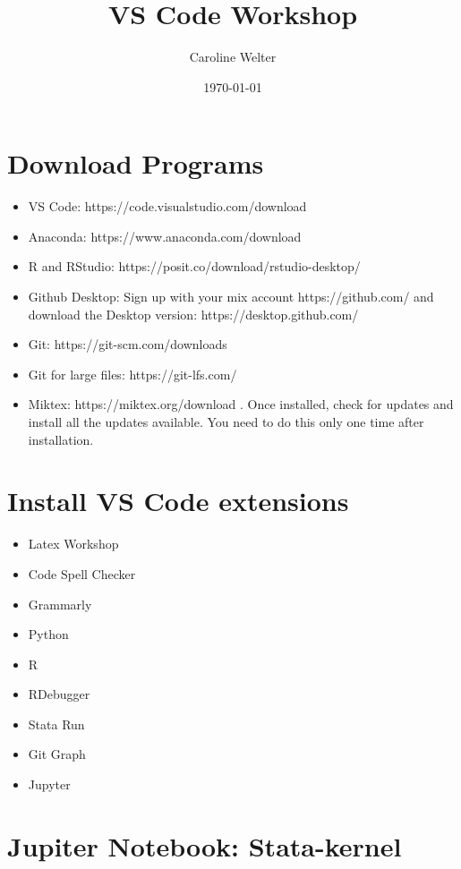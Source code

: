 \documentclass[12pt]{article}
\title{VS Code Workshop}
\author{Caroline Welter}
\date{\today}
\begin{document}
 
\maketitle
{}
\thispagestyle{empty}


\section{Download Programs}

\begin{itemize}
  \item VS Code: https://code.visualstudio.com/download
  \item Anaconda: https://www.anaconda.com/download 
  \item R and RStudio: https://posit.co/download/rstudio-desktop/
  \item Github Desktop: Sign up with your mix account https://github.com/ and download the Desktop version: https://desktop.github.com/
  \item Git: https://git-scm.com/downloads
  \item Git for large files: https://git-lfs.com/
  \item Miktex: https://miktex.org/download . Once installed, check for updates and install all the updates available. You need to do this only one time after installation.
\end{itemize}

\section{Install VS Code extensions}
\begin{itemize}
  \item Latex Workshop
  \item Code Spell Checker
  \item Grammarly
  \item Python
  \item R
  \item RDebugger
  \item Stata Run
  \item Git Graph
  \item Jupyter
\end{itemize}

\section{Jupiter Notebook: Stata-kernel}
\end{document}
